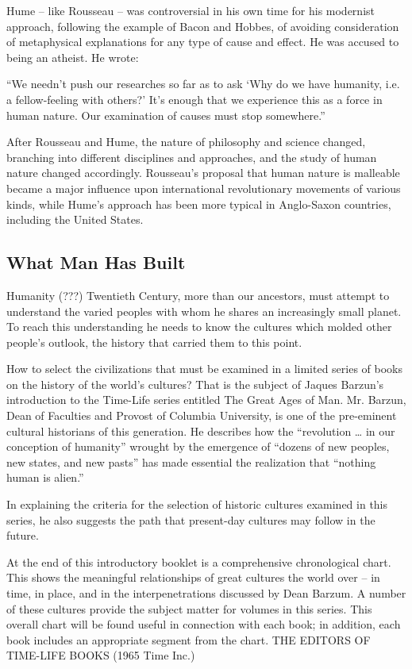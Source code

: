 Hume – like Rousseau – was controversial in his own time for his modernist approach, following the example of Bacon and Hobbes, of avoiding consideration of metaphysical explanations for any type of cause and effect. He was accused to being an atheist. He wrote:

``We needn’t push our researches so far as to ask `Why do we have humanity, i.e. a fellow-feeling with others?'  It’s enough that we experience this as a force in human nature. Our examination of causes must stop somewhere.''

After Rousseau and Hume, the nature of philosophy and science changed, branching into different disciplines and approaches, and the study of human nature changed accordingly. Rousseau’s proposal that human nature is malleable became a major influence upon international revolutionary movements of various kinds, while Hume’s approach has been more typical in Anglo-Saxon countries, including the United States.

\subsection{What Man Has Built}

Humanity (???) Twentieth Century, more than our ancestors, must attempt to understand the varied peoples with whom he shares an increasingly small planet. To reach this understanding he needs to know the cultures which molded other people’s outlook, the history that carried them to this point.

How to select the civilizations that must be examined in a limited series of books on the history of the world’s cultures?  That is the subject of Jaques Barzun’s introduction to the Time-Life series entitled The Great Ages of Man. Mr. Barzun, Dean of Faculties and Provost of Columbia University, is one of the pre-eminent cultural historians of this generation. He describes how the “revolution … in our conception of humanity” wrought by the emergence of “dozens of new peoples, new states, and new pasts” has made essential the realization that “nothing human is alien.”

In explaining the criteria for the selection of historic cultures examined in this series, he also suggests the path that present-day cultures may follow in the future.

At the end of this introductory booklet is a comprehensive chronological chart. This shows the meaningful relationships of great cultures the world over – in time, in place, and in the interpenetrations discussed by Dean Barzum. A number of these cultures provide the subject matter for volumes in this series. This overall chart will be found useful in connection with each book; in addition, each book includes an appropriate segment from the chart. THE EDITORS OF TIME-LIFE BOOKS (1965 Time Inc.)

